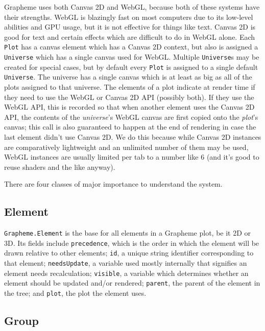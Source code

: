 \documentclass{article}
\begin{document}
Grapheme uses both Canvas 2D and WebGL, because both of these systems have their strengths. WebGL is blazingly fast on most computers due to its low-level abilities and GPU usage, but it is not effective for things like text. Canvas 2D is good for text and certain effects which are difficult to do in WebGL alone. Each \texttt{Plot} has a canvas element which has a Canvas 2D context, but also is assigned a \texttt{Universe} which has a single canvas used for WebGL. Multiple \texttt{Universe}s may be created for special cases, but by default every \texttt{Plot} is assigned to a single default \texttt{Universe}. The universe has a single canvas which is at least as
big as all of the plots assigned to that universe. The elements of a plot indicate at render time if they need to use the WebGL or Canvas 2D API (possibly both). If they use the WebGL API, this is recorded so that when another element uses the Canvas 2D API, the contents of the \textit{universe}'s WebGL canvas are first copied onto the \textit{plot}'s canvas; this call is also guaranteed to happen at the end of rendering in case the last element didn't use Canvas 2D. We do this because while Canvas 2D instances are comparatively lightweight and an unlimited number of them may be used, WebGL instances are usually limited per tab to a number like $6$ (and it's good to reuse shaders and the like anyway).

There are four classes of major importance to understand the system.

\subsection{Element}

\texttt{Grapheme.Element} is the base for all elements in a Grapheme plot, be it 2D or 3D. Its fields include \texttt{precedence}, which is the order in which the element will be drawn relative to other elements; \texttt{id}, a unique string identifier corresponding to that element; \texttt{needsUpdate}, a variable used mostly internally that signifies an element needs recalculation; \texttt{visible}, a variable which determines whether an element should be updated and/or rendered; \texttt{parent}, the parent of the element in the tree; and \texttt{plot}, the plot the element uses.

\subsection{Group}
\end{document}
